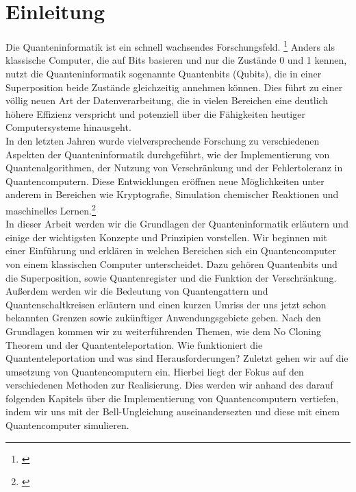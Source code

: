 \section{Einleitung}
\label{sec:einleitung}

Die Quanteninformatik ist ein schnell wachsendes Forschungsfeld. \footnote{\cite[S. XII.]{homeister_quantum_2022}}
Anders als klassische Computer, die auf Bits basieren und nur die Zustände 0 und 1 kennen, nutzt die Quanteninformatik sogenannte Quantenbits (Qubits), die in einer Superposition beide Zustände gleichzeitig annehmen können.
Dies führt zu einer völlig neuen Art der Datenverarbeitung, die in vielen Bereichen eine deutlich höhere Effizienz verspricht und potenziell über die Fähigkeiten heutiger Computersysteme hinausgeht.\\

In den letzten Jahren wurde vielversprechende Forschung zu verschiedenen Aspekten der Quanteninformatik durchgeführt, wie der Implementierung von Quantenalgorithmen, der Nutzung von Verschränkung und der Fehlertoleranz in Quantencomputern.
Diese Entwicklungen eröffnen neue Möglichkeiten unter anderem in Bereichen wie Kryptografie, Simulation chemischer Reaktionen und maschinelles Lernen.\footnote{\cite{Fraunhofer_quantencomputing_2025}}\\

In dieser Arbeit werden wir die Grundlagen der Quanteninformatik erläutern und einige der wichtigsten Konzepte und Prinzipien vorstellen.
Wir beginnen mit einer Einführung und erklären in welchen Bereichen sich ein Quantencomputer von einem klassischen Computer unterscheidet.
Dazu gehören Quantenbits und die Superposition, sowie Quantenregister und die Funktion der Verschränkung.
Außerdem werden wir die Bedeutung von Quantengattern und Quantenschaltkreisen erläutern und einen kurzen Umriss der uns jetzt schon bekannten Grenzen sowie zukünftiger Anwendungsgebiete geben.
Nach den Grundlagen kommen wir zu weiterführenden Themen, wie dem No Cloning Theorem und der Quantenteleportation.
Wie funktioniert die Quantenteleportation und was sind Herausforderungen?
Zuletzt gehen wir auf die umsetzung von Quantencomputern ein. Hierbei liegt der Fokus auf den verschiedenen Methoden zur Realisierung.
Dies werden wir anhand des darauf folgenden Kapitels über die Implementierung von Quantencomputern vertiefen, indem wir uns mit der Bell-Ungleichung auseinandersezten und diese mit einem Quantencomputer simulieren.